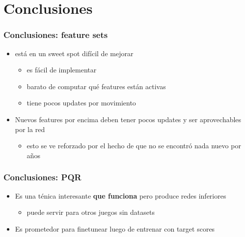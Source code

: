 
\section{Conclusiones}

\begin{frame}
\frametitle{Conclusiones: feature sets}
\begin{itemize}
\item {} está en un sweet spot difícil de mejorar
\begin{itemize}
    \item es fácil de implementar
    \item barato de computar qué features están activas
    \item tiene pocos updates por movimiento
\end{itemize}
\pause
\item Nuevos features por encima deben tener pocos updates y ser aprovechables por la red
\begin{itemize}
    \item esto se ve reforzado por el hecho de que no se encontró nada nuevo por años
\end{itemize}
\end{itemize}
\end{frame}

\begin{frame}
\frametitle{Conclusiones: PQR}
\begin{itemize}
\item Es una ténica interesante \textbf{que funciona} pero produce redes inferiores \pause
\begin{itemize}
    \item puede servir para otros juegos sin datasets \pause
\end{itemize}
\item Es prometedor para finetunear luego de entrenar con target scores
\end{itemize}
\end{frame}
